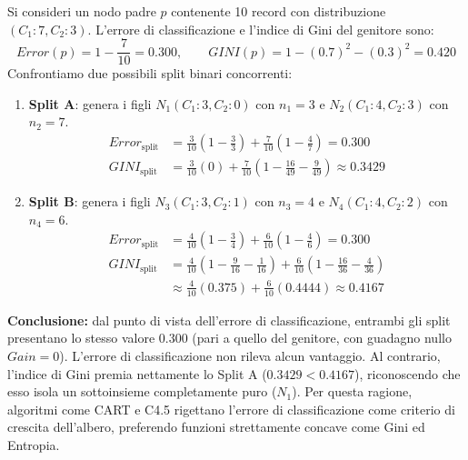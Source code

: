 \begin{example}
Si consideri un nodo padre $p$ contenente 10 record con distribuzione $(C_1: 7, C_2: 3)$. L'errore di classificazione e l'indice di Gini del genitore sono:
\begin{equation}
    Error(p) = 1 - \frac{7}{10} = 0.300, \qquad GINI(p) = 1 - (0.7)^2 - (0.3)^2 = 0.420
\end{equation}
Confrontiamo due possibili split binari concorrenti:
\begin{enumerate}
    \item \textbf{Split A}: genera i figli $N_1 (C_1: 3, C_2: 0)$ con $n_1 = 3$ e $N_2 (C_1: 4, C_2: 3)$ con $n_2 = 7$.
    \begin{align}
        Error_{\text{split}} &= \frac{3}{10}\left(1 - \frac{3}{3}\right) + \frac{7}{10}\left(1 - \frac{4}{7}\right) = 0.300 \\
        GINI_{\text{split}} &= \frac{3}{10}(0) + \frac{7}{10}\left(1 - \frac{16}{49} - \frac{9}{49}\right) \approx 0.3429
    \end{align}
    \item \textbf{Split B}: genera i figli $N_3 (C_1: 3, C_2: 1)$ con $n_3 = 4$ e $N_4 (C_1: 4, C_2: 2)$ con $n_4 = 6$.
    \begin{align}
        Error_{\text{split}} &= \frac{4}{10}\left(1 - \frac{3}{4}\right) + \frac{6}{10}\left(1 - \frac{4}{6}\right) = 0.300 \\
        GINI_{\text{split}} &= \frac{4}{10}\left(1 - \frac{9}{16} - \frac{1}{16}\right) + \frac{6}{10}\left(1 - \frac{16}{36} - \frac{4}{36}\right) \nonumber \\
        &\approx \frac{4}{10}(0.375) + \frac{6}{10}(0.4444) \approx 0.4167
    \end{align}
\end{enumerate}
\textbf{Conclusione:} dal punto di vista dell'errore di classificazione, entrambi gli split presentano lo stesso valore $0.300$ (pari a quello del genitore, con guadagno nullo $Gain = 0$). L'errore di classificazione non rileva alcun vantaggio. Al contrario, l'indice di Gini premia nettamente lo Split A ($0.3429 < 0.4167$), riconoscendo che esso isola un sottoinsieme completamente puro ($N_1$). Per questa ragione, algoritmi come CART e C4.5 rigettano l'errore di classificazione come criterio di crescita dell'albero, preferendo funzioni strettamente concave come Gini ed Entropia.
\end{example}

